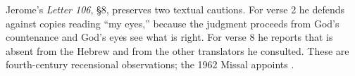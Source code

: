 Jerome's \emph{Letter 106}, §8, preserves two textual cautions. For verse 2 he
defends  against copies reading ``my eyes,'' because the
judgment proceeds from God's countenance and God's eyes see what is right. For
verse 8 he reports that  is absent from the Hebrew and from the
other translators he consulted. These are fourth-century recensional
observations; the 1962 Missal appoints .
